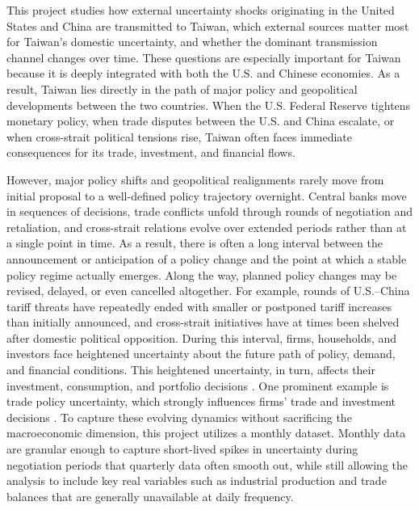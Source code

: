 This project studies how external uncertainty shocks originating in the United States and China are transmitted to Taiwan, which external sources matter most for Taiwan's domestic uncertainty, and whether the dominant transmission channel changes over time. These questions are especially important for Taiwan because it is deeply integrated with both the U.S. and Chinese economies. As a result, Taiwan lies directly in the path of major policy and geopolitical developments between the two countries. When the U.S. Federal Reserve tightens monetary policy, when trade disputes between the U.S. and China escalate, or when cross-strait political tensions rise, Taiwan often faces immediate consequences for its trade, investment, and financial flows.

However, major policy shifts and geopolitical realignments rarely move from initial proposal to a well-defined policy trajectory overnight. Central banks move in sequences of decisions, trade conflicts unfold through rounds of negotiation and retaliation, and cross-strait relations evolve over extended periods rather than at a single point in time. As a result, there is often a long interval between the announcement or anticipation of a policy change and the point at which a stable policy regime actually emerges. Along the way, planned policy changes may be revised, delayed, or even cancelled altogether. For example, rounds of U.S.--China tariff threats have repeatedly ended with smaller or postponed tariff increases than initially announced, and cross-strait initiatives have at times been shelved after domestic political opposition. During this interval, firms, households, and investors face heightened uncertainty about the future path of policy, demand, and financial conditions. This heightened uncertainty, in turn, affects their investment, consumption, and portfolio decisions \citep{bloom2009impact,bloom2014fluctuations}. One prominent example is trade policy uncertainty, which strongly influences firms' trade and investment decisions \citep{handley2022tpu}. To capture these evolving dynamics without sacrificing the macroeconomic dimension, this project utilizes a monthly dataset. Monthly data are granular enough to capture short-lived spikes in uncertainty during negotiation periods that quarterly data often smooth out, while still allowing the analysis to include key real variables such as industrial production and trade balances that are generally unavailable at daily frequency.

